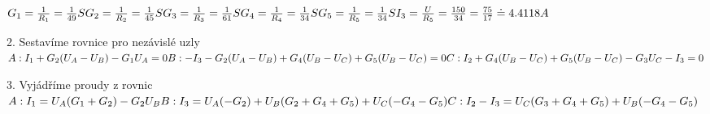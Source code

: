 \documentclass[12pt,a4paper]{article} %
\begin{document}
		\medskip
		\(
		\\G_1 = \frac{1}{R_1} = \frac{1}{49} S
		\medskip
		\\G_2 = \frac{1}{R_2} = \frac{1}{45} S
		\medskip
		\\G_3 = \frac{1}{R_3} = \frac{1}{61} S
		\medskip
		\\G_4 = \frac{1}{R_4} = \frac{1}{34} S
		\medskip
		\\G_5 = \frac{1}{R_5} = \frac{1}{34} S
		\medskip
		\\I_3 = \frac{U}{R_5} = \frac{150}{34} = \frac{75}{17} \doteq 4.4118 A
	    \)
	    
	    \bigskip
	    \bigskip
	    \bigskip
		\bigskip

		2. Sestavíme rovnice pro nezávislé uzly
		\medskip
		\(
		\\A: I_1 + G_2 (U_A - U_B) - G_1 U_A = 0 
		\medskip
		\\B: -I_3 - G_2 (U_A - U_B) + G_4 (U_B - U_C) + G_5 (U_B - U_C) = 0 
		\medskip
		\\C: I_2 + G_4 (U_B - U_C) + G_5 (U_B - U_C) - G_3 U_C - I_3 = 0
	    \)
		
		\bigskip
		\bigskip
		
		3. Vyjádříme proudy z rovnic
				\medskip
		\(
		\\A: I_1 = U_A (G_1 + G_2) - G_2 U_B
		\medskip
		\\B: I_3 = U_A (-G_2) + U_B (G_2 + G_4 + G_5) + U_C (-G_4 - G_5)
		\medskip
		\\C: I_2 - I_3 = U_C (G_3 + G_4 + G_5) + U_B (-G_4 - G_5)
	    \)
		
\end{document}
